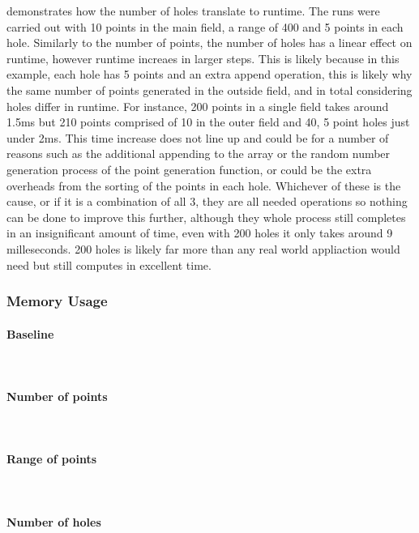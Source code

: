 \documentclass[final]{cmpreport_02}
\begin{document}
 demonstrates how the number of holes translate to runtime.
The runs were carried out with 10 points in the main field, a range of 400 and 5 points in each hole.
Similarly to the number of points, the number of holes has a linear effect on runtime, however runtime increaes in larger steps.
This is likely because in this example, each hole has 5 points and an extra append operation, this is likely why the same number of points generated in the outside field, and in total considering holes differ in runtime.
For instance, 200 points in a single field takes around 1.5ms but 210 points comprised of 10 in the outer field and 40, 5 point holes just under 2ms.
This time increase does not line up and could be for a number of reasons such as the additional appending to the array or the random number generation process of the point generation function, or could be the extra overheads from the sorting of the points in each hole.
Whichever of these is the cause, or if it is a combination of all 3, they are all needed operations so nothing can be done to improve this further, although they whole process still completes in an insignificant amount of time, even with 200 holes it only takes around 9 milleseconds.
200 holes is likely far more than any real world appliaction would need but still computes in excellent time.


\subsubsection{Memory Usage}

\paragraph{Baseline} \

\paragraph{Number of points} \

\paragraph{Range of points} \

\paragraph{Number of holes} \
\end{document}
